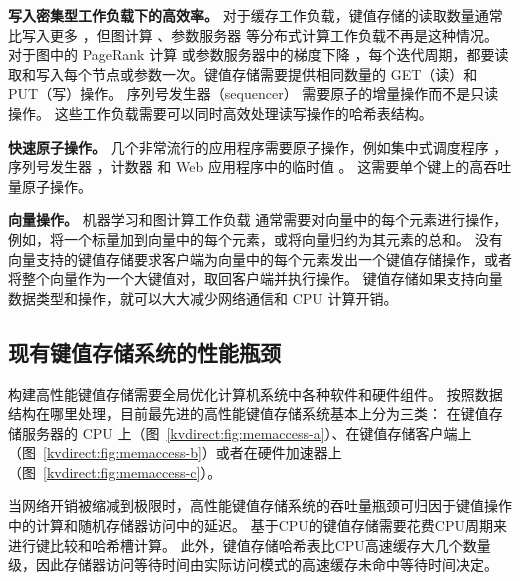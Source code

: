 \textbf {写入密集型工作负载下的高效率。}
对于缓存工作负载，键值存储的读取数量通常比写入更多 \cite {atikoglu2012workload}，但图计算 \cite {page1999pagerank}、参数服务器\cite {li2014scaling} 等分布式计算工作负载不再是这种情况。
对于图中的 PageRank 计算 \cite {page1999pagerank} 或参数服务器中的梯度下降 \cite {li2014scaling}，每个迭代周期，都要读取和写入每个节点或参数一次。键值存储需要提供相同数量的 GET（读）和 PUT（写）操作。
序列号发生器（sequencer）\cite {kalia2016design} 需要原子的增量操作而不是只读操作。
这些工作负载需要可以同时高效处理读写操作的哈希表结构。

\textbf {快速原子操作。}
几个非常流行的应用程序需要原子操作，例如集中式调度程序 \cite {perry2014fastpass}，序列号发生器 \cite {kalia2016design,eris}，计数器 \cite {zhu2015packet} 和 Web 应用程序中的临时值 \cite {atikoglu2012workload}。
这需要单个键上的高吞吐量原子操作。

\textbf {向量操作。}
机器学习和图计算工作负载 \cite {li2014scaling,shao2013trinity,xiao17tux2} 通常需要对向量中的每个元素进行操作，例如，将一个标量加到向量中的每个元素，或将向量归约为其元素的总和。
没有向量支持的键值存储要求客户端为向量中的每个元素发出一个键值存储操作，或者将整个向量作为一个大键值对，取回客户端并执行操作。
键值存储如果支持向量数据类型和操作，就可以大大减少网络通信和 CPU 计算开销。

\subsection{现有键值存储系统的性能瓶颈}
\label{kvdirect:sec:state-of-the-art-kvs}

构建高性能键值存储需要全局优化计算机系统中各种软件和硬件组件。
按照数据结构在哪里处理，目前最先进的高性能键值存储系统基本上分为三类：
在键值存储服务器的 CPU 上（图~\ref{kvdirect:fig:memaccess-a}）、在键值存储客户端上（图~\ref{kvdirect:fig:memaccess-b}）或者在硬件加速器上（图~\ref{kvdirect:fig:memaccess-c}）。


当网络开销被缩减到极限时，高性能键值存储系统的吞吐量瓶颈可归因于键值操作中的计算和随机存储器访问中的延迟。
基于CPU的键值存储需要花费CPU周期来进行键比较和哈希槽计算。
此外，键值存储哈希表比CPU高速缓存大几个数量级，因此存储器访问等待时间由实际访问模式的高速缓存未命中等待时间决定。


